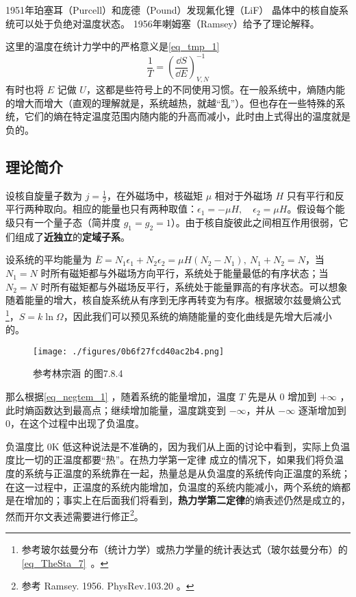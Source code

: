 

1951年珀塞耳（Purcell）和庞德（Pound）发现氟化锂（LiF） 晶体中的核自旋系统可以处于负绝对温度状态。
1956年喇姆塞（Ramsey）给予了理论解释。\cite{热统}

这里的温度在统计力学中的严格意义是\autoref{eq_tmp_1}~
\begin{equation}\label{eq_negtem_1}
\frac{1}{T}=\left(\frac{\dd S}{\dd E}\right)_{V,N}^{-1}
\end{equation}
有时也将 $E$ 记做 $U$，这都是些符号上的不同使用习惯。在一般系统中，熵随内能的增大而增大（直观的理解就是，系统越热，就越“乱”）。但也存在一些特殊的系统，它们的熵在特定温度范围内随内能的升高而减小，此时由上式得出的温度就是负的。

\subsection{理论简介}
设核自旋量子数为 $j=\frac{1}{2}$，在外磁场中，核磁矩 $\mu$ 相对于外磁场 $H$ 只有平行和反平行两种取向。相应的能量也只有两种取值：$\epsilon_1=-\mu H,\quad \epsilon_2=\mu H$。假设每个能级只有一个量子态（简并度 $g_1=g_2=1$）。由于核自旋彼此之间相互作用很弱，它们组成了\textbf{近独立}的\textbf{定域子系}。

设系统的平均能量为 $\bar{E}=N_1\epsilon_1+N_2\epsilon_2=\mu H(N_2-N_1),\ N_1+N_2=N$，当 $N_1=N$ 时所有磁矩都与外磁场方向平行，系统处于能量最低的有序状态；当 $N_2=N$ 时所有磁矩都与外磁场反平行，系统处于能量罪高的有序状态。可以想象随着能量的增大，核自旋系统从有序到无序再转变为有序。根据玻尔兹曼熵公式\footnote{参考玻尔兹曼分布（统计力学）或热力学量的统计表达式（玻尔兹曼分布）的\autoref{eq_TheSta_7}~。}，$S=k\ln \Omega$，因此我们可以预见系统的熵随能量的变化曲线是先增大后减小的。
\begin{figure}[ht]
\centering
\texttt{[image: ./figures/0b6f27fcd40ac2b4.png]}
\caption{参考林宗涵\cite{林宗涵} 的图7.8.4} \label{fig_negtem_1}
\end{figure}
那么根据\autoref{eq_negtem_1} ，随着系统的能量增加，温度 $T$ 先是从 $0$ 增加到 $+\infty$ ，此时熵函数达到最高点；继续增加能量，温度跳变到 $-\infty$，并从 $-\infty$ 逐渐增加到 $0$，在这个过程中出现了负温度。

负温度比 $0 \mathrm{K}$ 低这种说法是不准确的，因为我们从上面的讨论中看到，实际上负温度比一切的正温度都要“热”。在热力学第一定律 成立的情况下，如果我们将负温度的系统与正温度的系统靠在一起，热量总是从负温度的系统传向正温度的系统；在这一过程中，正温度的系统内能增加，负温度的系统内能减小，两个系统的熵都是在增加的；事实上在后面我们将看到，\textbf{热力学第二定律}的熵表述仍然是成立的，然而开尔文表述需要进行修正\footnote{参考 Ramsey. 1956. PhysRev.103.20 。}。
